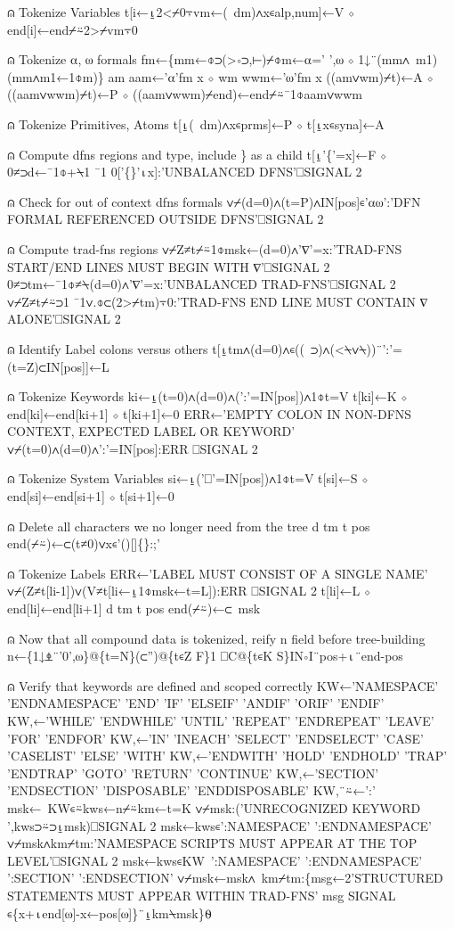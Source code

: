 \documentclass{article}%
\begin{document}
⍝ Tokenize Variables
   t[i←⍸2<⌿0⍪vm←(~dm)∧x∊alp,num]←V ⋄ end[i]←end⌿⍨2>⌿vm⍪0

⍝ Tokenize ⍺, ⍵ formals
   fm←\{mm←⌽⊃(>∘⊃,⊢)⌿⌽m←⍺=' ',⍵ ⋄ 1↓¨(mm∧~m1)(mm∧m1←1⌽m)\}
   am aam←'⍺'fm x ⋄ wm wwm←'⍵'fm x
   ((am∨wm)⌿t)←A ⋄ ((aam∨wwm)⌿t)←P ⋄ ((aam∨wwm)⌿end)←end⌿⍨¯1⌽aam∨wwm

⍝ Tokenize Primitives, Atoms
   t[⍸(~dm)∧x∊prms]←P ⋄ t[⍸x∊syna]←A

⍝ Compute dfns regions and type, include \} as a child
   t[⍸'\{'=x]←F ⋄ 0≠⊃d←¯1⌽+⍀1 ¯1 0['\{\}'⍳x]:'UNBALANCED DFNS'⎕SIGNAL 2

⍝ Check for out of context dfns formals
   ∨⌿(d=0)∧(t=P)∧IN[pos]∊'⍺⍵':'DFN FORMAL REFERENCED OUTSIDE DFNS'⎕SIGNAL 2

⍝ Compute trad-fns regions
   ∨⌿Z≠t⌿⍨1⌽msk←(d=0)∧'∇'=x:'TRAD-FNS START/END LINES MUST BEGIN WITH ∇'⎕SIGNAL 2
   0≠⊃tm←¯1⌽≠⍀(d=0)∧'∇'=x:'UNBALANCED TRAD-FNS'⎕SIGNAL 2
   ∨⌿Z≠t⌿⍨⊃1 ¯1∨.⌽⊂(2>⌿tm)⍪0:'TRAD-FNS END LINE MUST CONTAIN ∇ ALONE'⎕SIGNAL 2

⍝ Identify Label colons versus others
   t[⍸tm∧(d=0)∧∊((~⊃)∧(<⍀∨⍀))¨':'=(t=Z)⊂IN[pos]]←L

⍝ Tokenize Keywords
   ki←⍸(t=0)∧(d=0)∧(':'=IN[pos])∧1⌽t=V
   t[ki]←K ⋄ end[ki]←end[ki+1] ⋄ t[ki+1]←0
   ERR←'EMPTY COLON IN NON-DFNS CONTEXT, EXPECTED LABEL OR KEYWORD'
   ∨⌿(t=0)∧(d=0)∧':'=IN[pos]:ERR ⎕SIGNAL 2

⍝ Tokenize System Variables
   si←⍸('⎕'=IN[pos])∧1⌽t=V
   t[si]←S ⋄ end[si]←end[si+1] ⋄ t[si+1]←0

⍝ Delete all characters we no longer need from the tree
   d tm t pos end(⌿⍨)←⊂(t≠0)∨x∊'()[]\{\}:;'

⍝ Tokenize Labels
   ERR←'LABEL MUST CONSIST OF A SINGLE NAME'
   ∨⌿(Z≠t[li-1])∨(V≠t[li←⍸1⌽msk←t=L]):ERR ⎕SIGNAL 2
   t[li]←L ⋄ end[li]←end[li+1]
   d tm t pos end(⌿⍨)←⊂~msk

⍝ Now that all compound data is tokenized, reify n field before tree-building
   n←\{1↓⍎¨'0',⍵\}@\{t=N\}(⊂'')@\{t∊Z F\}1 ⎕C@\{t∊K S\}IN∘I¨pos+⍳¨end-pos

⍝ Verify that keywords are defined and scoped correctly
   KW←'NAMESPACE' 'ENDNAMESPACE' 'END' 'IF' 'ELSEIF' 'ANDIF' 'ORIF' 'ENDIF'
   KW,←'WHILE' 'ENDWHILE' 'UNTIL' 'REPEAT' 'ENDREPEAT' 'LEAVE' 'FOR' 'ENDFOR'
   KW,←'IN' 'INEACH' 'SELECT' 'ENDSELECT' 'CASE' 'CASELIST' 'ELSE' 'WITH'
   KW,←'ENDWITH' 'HOLD' 'ENDHOLD' 'TRAP' 'ENDTRAP' 'GOTO' 'RETURN' 'CONTINUE'
   KW,←'SECTION' 'ENDSECTION' 'DISPOSABLE' 'ENDDISPOSABLE'
   KW,¨⍨←':'
   msk←~KW∊⍨kws←n⌿⍨km←t=K
   ∨⌿msk:('UNRECOGNIZED KEYWORD ',kws⊃⍨⊃⍸msk)⎕SIGNAL 2
   msk←kws∊':NAMESPACE' ':ENDNAMESPACE'
   ∨⌿msk∧km⌿tm:'NAMESPACE SCRIPTS MUST APPEAR AT THE TOP LEVEL'⎕SIGNAL 2
   msk←kws∊KW~':NAMESPACE' ':ENDNAMESPACE' ':SECTION' ':ENDSECTION'
   ∨⌿msk←msk∧~km⌿tm:\{msg←2'STRUCTURED STATEMENTS MUST APPEAR WITHIN TRAD-FNS'
     msg SIGNAL ∊\{x+⍳end[⍵]-x←pos[⍵]\}¨⍸km⍀msk\}⍬
\end{document}
